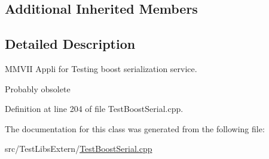 \subsection*{Additional Inherited Members}


\subsection{Detailed Description}
M\+M\+V\+II Appli for Testing boost serialization service. 

Probably obsolete 

Definition at line 204 of file Test\+Boost\+Serial.\+cpp.



The documentation for this class was generated from the following file\+:\begin{DoxyCompactItemize}
\item 
src/\+Test\+Libs\+Extern/\hyperlink{TestBoostSerial_8cpp}{Test\+Boost\+Serial.\+cpp}\end{DoxyCompactItemize}
